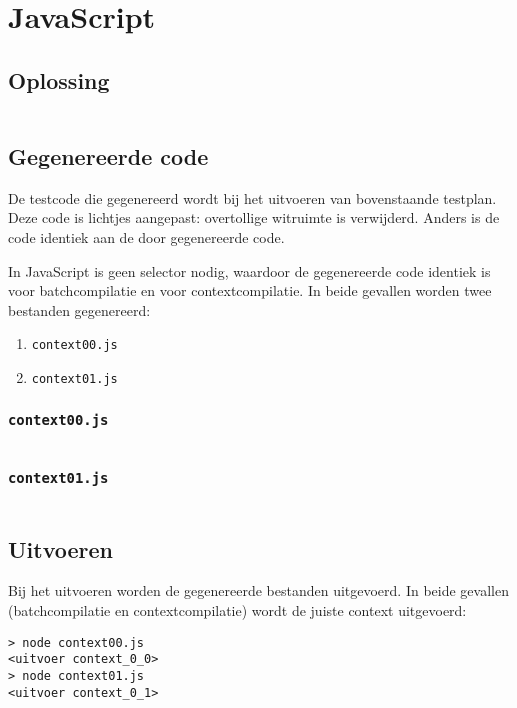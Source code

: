 \section{JavaScript}\label{sec:echo-javascript}

\subsection{Oplossing}\label{subsec:echo-javascript-oplossing}

\inputminted{python}{sources/echo/correct.js}

\subsection{Gegenereerde code}\label{subsec:echo-javascript-gegenereerde-code}

De testcode die gegenereerd wordt bij het uitvoeren van bovenstaande testplan.
Deze code is lichtjes aangepast: overtollige witruimte is verwijderd.
Anders is de code identiek aan de door \tested{} gegenereerde code.

In JavaScript is geen selector nodig, waardoor de gegenereerde code identiek is voor batchcompilatie en voor contextcompilatie.
In beide gevallen worden twee bestanden gegenereerd:

\begin{enumerate}
    \item \texttt{context00.js}
    \item \texttt{context01.js}
\end{enumerate}

\subsubsection{\texttt{context00.js}}

\inputminted{javascript}{sources/echo/context00.js}

\subsubsection{\texttt{context01.js}}

\inputminted{python}{sources/echo/context01.js}

\subsection{Uitvoeren}\label{subsec:echo-javascript-uitvoeren}

Bij het uitvoeren worden de gegenereerde bestanden uitgevoerd.
In beide gevallen (batchcompilatie en contextcompilatie) wordt de juiste context uitgevoerd:

\begin{verbatim}
> node context00.js
<uitvoer context_0_0>
> node context01.js
<uitvoer context_0_1>
\end{verbatim}